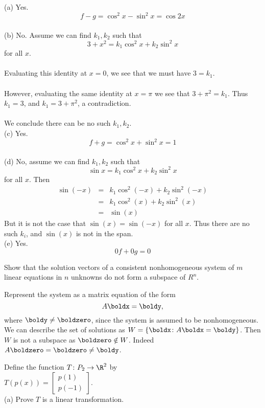 \begin{solution}
\noindent (a) Yes.
$$
f - g = \cos^2x - \sin^2x = \cos2x
$$
\ \\
(b) No. Assume we can find $k_1, k_2$ such that 
$$
3+x^2 = k_1\cos^2x +k_2\sin^2x
$$
for all $x$. 
\\
\\
Evaluating this identity at $x=0$, we see that we must have $3=k_1$. 
\\ \\
However, evaluating the same identity at $x=\pi$ we see that $3+\pi^2=k_1$. Thus $k_1=3$, and $k_1=3+\pi^2$, a contradiction. 
\\ \\
We conclude there can be no such $k_1, k_2$. 
\ \\
(c) Yes.
$$
f + g = \cos^2x + \sin^2x = 1
$$
\ \\
(d) No, assume we can find $k_1, k_2$ such that 
$$
\sin x = k_1\cos^2x + k_2\sin^2x
$$
for all $x$. Then 
\begin{eqnarray*}
\sin(-x) &=& k_1\cos^2(-x) + k_2\sin^2(-x)\\
&=& k_1\cos^2(x) + k_2\sin^2(x)\\
&=&\sin(x)
\end{eqnarray*}
But it is not the case that $\sin(x)=\sin(-x)$ for all $x$.  Thus there are no such $k_i$, and $\sin(x)$ is not in the span.
\ \\
(e) 
 Yes.
$$
0f + 0g = 0
$$
\end{solution}
\ii Show that the solution vectors of a consistent nonhomogeneous system of $m$ linear equations in $n$ unknowns do not form a subspace of $R^n$.
\\
\begin{solution}
\noindent
Represent the system as a matrix equation of the form 
\[
A\boldx=\boldy,
\]
where $\boldy\ne\boldzero$, since the system is assumed to be nonhomogeneous. 
\\
We can describe the set of solutions as $W=\{\boldx\colon A\boldx=\boldy\}$. Then $W$ is not a subspace as $\boldzero\notin W$. Indeed $A\boldzero=\boldzero\ne\boldy$. 
\end{solution}
\ii Define the function $T\colon P_2\rightarrow \R^2$ by
\\
$
T(p(x))=\begin{bmatrix} p(1)\\ p(-1) \end{bmatrix}.
$
\\
(a) Prove $T$ is a linear transformation. 
